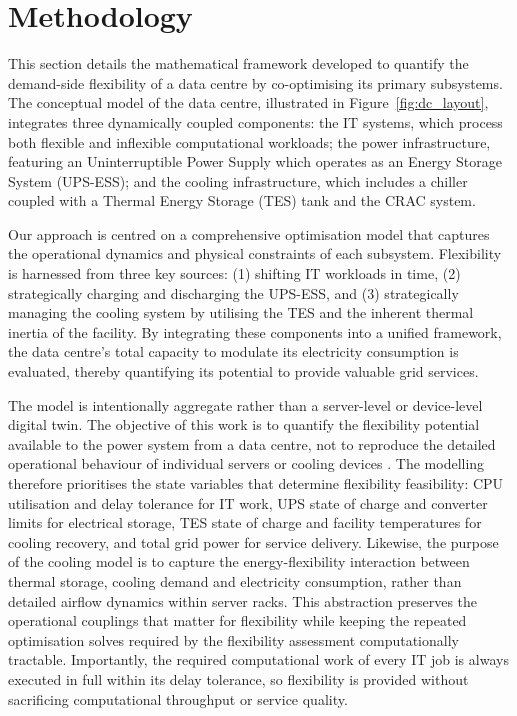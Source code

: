 \documentclass[lettersize,journal]{IEEEtran}
\newcommand{\rev}[1]{\textcolor{blue!70!black}{#1}}
\begin{document}
\section{Methodology}
This section details the mathematical framework developed to quantify the demand-side flexibility of a data centre by co-optimising its primary subsystems. The conceptual model of the data centre, illustrated in Figure~\ref{fig:dc_layout}, integrates three dynamically coupled components: the IT systems, which process both flexible and inflexible computational workloads; the power infrastructure, featuring an Uninterruptible Power Supply which operates as an Energy Storage System (UPS-ESS); and the cooling infrastructure, which includes a chiller coupled with a Thermal Energy Storage (TES) tank and the CRAC system. 

Our approach is centred on a comprehensive optimisation model that captures the operational dynamics and physical constraints of each subsystem. Flexibility is harnessed from three key sources: (1) shifting  IT workloads in time, (2) strategically charging and discharging the UPS-ESS, and (3) strategically managing the cooling system by utilising the TES and the inherent thermal inertia of the facility. By integrating these components into a unified framework, the data centre's total capacity to modulate its electricity consumption is evaluated, thereby quantifying its potential to provide valuable grid services.

\rev{The model is intentionally aggregate rather than a server-level or device-level digital twin. The objective of this work is to quantify the flexibility potential available to the power system from a data centre, not to reproduce the detailed operational behaviour of individual servers or cooling devices \cite{barroso2018datacenter,dayarathna2015data}. The modelling therefore prioritises the state variables that determine flexibility feasibility: CPU utilisation and delay tolerance for IT work, UPS state of charge and converter limits for electrical storage, TES state of charge and facility temperatures for cooling recovery, and total grid power for service delivery. Likewise, the purpose of the cooling model is to capture the energy-flexibility interaction between thermal storage, cooling demand and electricity consumption, rather than detailed airflow dynamics within server racks. This abstraction preserves the operational couplings that matter for flexibility while keeping the repeated optimisation solves required by the flexibility assessment computationally tractable. Importantly, the required computational work of every IT job is always executed in full within its delay tolerance, so flexibility is provided without sacrificing computational throughput or service quality.}
\end{document}
